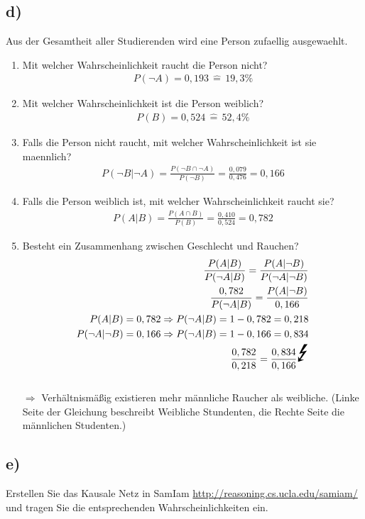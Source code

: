 \documentclass[12pt, a4paper]{article}
\begin{document}
\subsection*{d)}
Aus der Gesamtheit aller Studierenden wird eine Person zufaellig ausgewaehlt.
\begin{enumerate}
\item Mit welcher Wahrscheinlichkeit raucht die Person nicht?\\
\begin{align}
P(\neg A) = 0,193 \, \widehat{=} \, 19,3\%
\end{align}
\item Mit welcher Wahrscheinlichkeit ist die Person weiblich?
\begin{align}
P(B) = 0,524 \, \widehat{=} \, 52,4\%
\end{align}
\item Falls die Person nicht raucht, mit welcher Wahrscheinlichkeit ist sie maennlich?
\begin{align}
P(\neg B | \neg A) = \frac{P(\neg B \cap \neg A)}{P(\neg B)} = \frac{0,079}{0,476} = 0,166
\end{align}
\item Falls die Person weiblich ist, mit welcher Wahrscheinlichkeit raucht sie?
\begin{align}
P(A | B) = \frac{P(A \cap B)}{P(B)} = \frac{0,410}{0,524} = 0,782
\end{align}
\item Besteht ein Zusammenhang zwischen Geschlecht und Rauchen?
\begin{align}
\frac{P(A | B)}{P(\neg A | B)} = \frac{P(A | \neg B)}{P(\neg A | \neg B)} \\
\frac{0,782}{P(\neg A | B)} = \frac{P(A | \neg B)}{0,166}
\\
P(A | B) = 0,782 \Rightarrow P(\neg A | B) = 1 - 0,782 = 0,218
\\
P(\neg A | \neg B) = 0,166 \Rightarrow P(\neg A | B) = 1 - 0,166 = 0,834
\\
\frac{0,782}{0,218} = \frac{0,834}{0,166}
\text{\Huge{\Lightning}}
\end{align}
\\
$\Rightarrow$ Verhältnismäßig existieren mehr männliche Raucher als weibliche. (Linke Seite der Gleichung beschreibt Weibliche Stundenten, die Rechte Seite die männlichen Studenten.)
\end{enumerate}
\subsection*{e)}
Erstellen Sie das Kausale Netz in SamIam \url{http://reasoning.cs.ucla.edu/samiam/} und tragen Sie die entsprechenden Wahrscheinlichkeiten ein.
\vspace{0.3cm}
\end{document}
